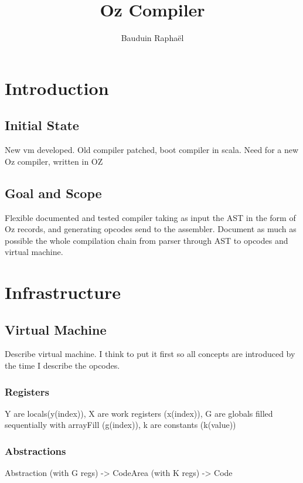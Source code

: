 \documentclass[a4paper]{memoir}
\author{Bauduin Raphaël}
\title{Oz Compiler}
\begin{document}
\lstset{language=Oz}


\ifdraftdoc
{}
\fi

\immediate{} 

\maketitle
\tableofcontents


\chapter{Introduction}
\section{Initial State}
New vm developed.
Old compiler patched, boot compiler in scala.
Need for a new Oz compiler, written in OZ

\section{Goal and Scope}
Flexible documented and tested compiler taking as input the AST in the form of Oz records, and generating opcodes send to the assembler.
Document as much as possible the whole compilation chain from parser through AST to opcodes and virtual machine.

\chapter{Infrastructure}
\section{Virtual Machine}
Describe virtual machine. I think to put it first so all concepts are introduced by the time I describe the opcodes.
\subsection{Registers}
Y are locals(y(index)), X are work registers (x(index)), G are globals filled sequentially with arrayFill (g(index)), k are constants (k(value))
\subsection{Abstractions}
Abstraction (with G regs)  -> CodeArea (with K regs) -> Code
\end{document}
